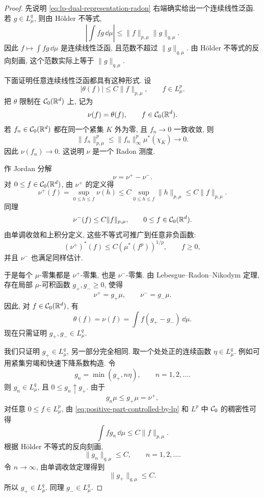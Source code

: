 \begin{proof}
	先说明 \eqref{eq:lp-dual-representation-radon} 右端确实给出一个连续线性泛函. 若 \(g\in L^q_\mu\), 则由 H\"older 不等式,
	\[
	\left|\int fg\,\dd\mu\right|
	\leq \|f\|_{p,\mu}\|g\|_{q,\mu}.
	\]
	因此 \(f\mapsto \int fg\,\dd\mu\) 是连续线性泛函, 且范数不超过
	\(\|g\|_{q,\mu}\). 由 H\"older 不等式的反向刻画, 这个范数实际上等于
	\(\|g\|_{q,\mu}\).
	
	下面证明任意连续线性泛函都具有这种形式. 设
	\[
	|\theta(f)|\leq C\|f\|_{p,\mu},
	\qquad f\in L^p_\mu.
	\]
	把 \(\theta\) 限制在 \(\mathcal{C}_0(\mathbb{R}^d)\) 上, 记为
	\[
	\nu(f)=\theta(f),
	\qquad f\in\mathcal{C}_0(\mathbb{R}^d).
	\]
	若 \(f_n\in\mathcal{C}_0(\mathbb{R}^d)\) 都在同一个紧集 \(K\) 外为零, 且 \(f_n\to0\) 一致收敛, 则
	\[
	\|f_n\|_{p,\mu}^p
	\leq \|f_n\|_\infty^p\mu^*(\chi_K)\to0.
	\]
	因此 \(\nu(f_n)\to0\). 这说明 \(\nu\) 是一个 Radon 测度.
	
	作 Jordan 分解
	\[
	\nu=\nu^+-\nu^-.
	\]
	对 \(0\leq f\in\mathcal{C}_0(\mathbb{R}^d)\), 由 \(\nu^+\) 的定义得
	\[
	\nu^+(f)
	=
	\sup_{0\leq h\leq f}\nu(h)
	\leq C\sup_{0\leq h\leq f}\|h\|_{p,\mu}
	\leq C\|f\|_{p,\mu}.
	\]
	同理
	\[
	\nu^-(f)\leq C\|f\|_{p,\mu},
	\qquad 0\leq f\in\mathcal{C}_0(\mathbb{R}^d).
	\]
	由单调收敛和上积分定义, 这些不等式可推广到任意非负函数:
	\begin{equation}
		(\nu^+)^*(f)
		\leq C\left(\mu^*(f^p)\right)^{1/p},
		\qquad f\geq0,
		\label{eq:positive-part-controlled-by-lp}
	\end{equation}
	并且 \(\nu^-\) 也满足同样估计.
	
	于是每个 \(\mu\)-零集都是 \(\nu^+\)-零集, 也是 \(\nu^-\)-零集. 由 Lebesgue--Radon--Nikodym 定理, 存在局部 \(\mu\)-可积函数 \(g_+,g_-\geq0\), 使得
	\[
	\nu^+=g_+\mu,
	\qquad
	\nu^-=g_-\mu.
	\]
	因此, 对 \(f\in\mathcal{C}_0(\mathbb{R}^d)\), 有
	\begin{equation}
		\theta(f)=\nu(f)=\int f(g_+-g_-)\,\dd\mu.
		\label{eq:theta-c0-density-before-lq}
	\end{equation}
	现在只需证明 \(g_+,g_-\in L^q_\mu\).
	
	我们只证明 \(g_+\in L^q_\mu\), 另一部分完全相同. 取一个处处正的连续函数 \(\eta\in L^q_\mu\). 例如可用紧集穷竭和快速下降系数构造. 令
	\[
	g_n=\min(g_+,n\eta),
	\qquad n=1,2,\ldots.
	\]
	则 \(g_n\in L^q_\mu\), 且 \(0\leq g_n\uparrow g_+\). 由于
	\[
	g_n\mu\leq g_+\mu=\nu^+,
	\]
	对任意 \(0\leq f\in L^p_\mu\), 由 \eqref{eq:positive-part-controlled-by-lp} 和 \(L^p\) 中 \(\mathcal{C}_0\) 的稠密性可得
	\[
	\int f g_n\,\dd\mu\leq C\|f\|_{p,\mu}.
	\]
	根据 H\"older 不等式的反向刻画,
	\[
	\|g_n\|_{q,\mu}\leq C,
	\qquad n=1,2,\ldots.
	\]
	令 \(n\to\infty\), 由单调收敛定理得到
	\[
	\|g_+\|_{q,\mu}\leq C.
	\]
	所以 \(g_+\in L^q_\mu\). 同理 \(g_-\in L^q_\mu\).
	

\end{proof}
